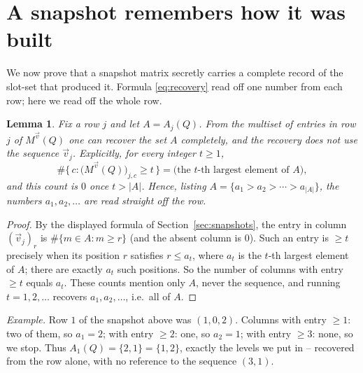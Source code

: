 \documentclass{article}
\newtheorem{lemma}[theorem]{Lemma}
\begin{document}
\section{A snapshot remembers how it was built}
\label{sec:remember}

We now prove that a snapshot matrix secretly carries a complete record of the
slot-set that produced it.  Formula \eqref{eq:recovery} read off one number from
each row; here we read off the whole row.

\begin{lemma}\label{lem:recover}
Fix a row $j$ and let $A=A_j(Q)$.  From the multiset of entries in row $j$ of
$M^{\vec v}(Q)$ one can recover the set $A$ completely, and the recovery does not
use the sequence $\vec v_j$.  Explicitly, for every integer $t\ge1$,
\[
\#\{\,c:\bigl(M^{\vec v}(Q)\bigr)_{j,c}\ge t\,\}
=
\bigl(\text{the $t$-th largest element of }A\bigr),
\]
and this count is $0$ once $t>|A|$.  Hence, listing $A=\{a_1>a_2>\cdots>a_{|A|}\}$,
the numbers $a_1,a_2,\ldots$ are read straight off the row.
\end{lemma}

\begin{proof}
By the displayed formula of Section~\ref{sec:snapshots}, the entry in column
$(\vec v_j)_r$ is $\#\{m\in A:m\ge r\}$ (and the absent column is $0$).  Such
an entry is $\ge t$ precisely when its position $r$ satisfies $r\le a_t$, where $a_t$
is the $t$-th largest element of $A$; there are exactly $a_t$ such positions.  So the
number of columns with entry $\ge t$ equals $a_t$.  These counts mention only $A$,
never the sequence, and running $t=1,2,\ldots$ recovers $a_1,a_2,\ldots$, i.e.\ all
of $A$.
\end{proof}

\noindent\textit{Example.}  Row $1$ of the snapshot above was $(1,0,2)$.  Columns
with entry $\ge1$: two of them, so $a_1=2$; with entry $\ge2$: one, so $a_2=1$;
with entry $\ge3$: none, so we stop.  Thus $A_1(Q)=\{2,1\}=\{1,2\}$, exactly the
levels we put in -- recovered from the row alone, with no reference to the sequence
$(3,1)$.
\end{document}
